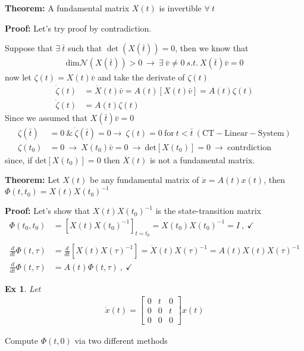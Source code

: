 \documentclass[twoside]{article}
\newtheorem{exmp}[theorem]{Ex}
\begin{document}
\textbf{Theorem:} A fundamental matrix $X(t)$ is invertible $\forall \ t$

\textbf{Proof:} Let's try proof by contradiction. 

Suppose that $\exists \ \bar{t}$ such that $\det( X(\bar{t}) ) = 0$, then we know that 
%
\begin{align*}
	\mathrm{dim} \mathcal{N}\left( X(\bar{t}) \right) > 0 \ \rightarrow \ \exists \ \bar{v}\neq0 \ s.t. \ X(\bar{t}) \bar{v} = 0
\end{align*}
%
now let $\zeta(t) = X(t) \bar{v}$ and take the derivate of $\zeta(t)$
%
\begin{align*}
	\dot{\zeta}(t) &= \dot{X}(t) \bar{v} = A(t) \left[ X(t) \bar{v} \right] = A(t) \zeta(t)
	\\
	\dot{\zeta}(t) &= A(t) \zeta(t)
\end{align*}
%
Since we assumed that $X(\bar{t}) \bar{v} = 0$
%
\begin{align*}
	\zeta(\bar{t}) &= 0 \ \& \ \dot{\zeta}(\bar{t}) = 0 \rightarrow \ \zeta(t) = 0 \ \mathrm{for} \ t < \bar{t} \ \mathrm{(CT-Linear-System)}
	\\
	\zeta(t_0) &= 0 \ \rightarrow \ X(t_0) \bar{v} = 0 \ \rightarrow \ \mathrm{det}[X(t_0)]=0 \ \rightarrow \ \mathrm{contrdiction}
\end{align*}
%
since, if $\mathrm{det}[X(t_0)]=0$ then $X(t)$ is not a fundamental matrix. 

\vspace{6pt}

\textbf{Theorem:} Let $X(t)$ be any fundamental matrix of $\dot{x} = A(t) x(t)$, then $\Phi(t,t_0) = X(t) X(t_0)^{-1}$

\textbf{Proof:} Let's show that $X(t) X(t_0)^{-1}$ is the state-transition matrix
%
\begin{align*}
\Phi(t_0,t_0) &= \left[ X(t) X(t_0)^{-1} \right]_{t=t_0} = X(t_0) X(t_0)^{-1}= I \ , \ \checkmark
	\\
	\\
	\frac{d}{dt} \Phi(t , \tau) &= \frac{d}{dt} \left[ X(t) X(\tau)^{-1} \right] = \dot{X}(t) X(\tau)^{-1}  = A(t) X(t) X(\tau)^{-1}
	\\
	\frac{d}{dt} \Phi(t , \tau) &= A(t) \Phi(t , \tau) \ , \ \checkmark
\end{align*}

\begin{exmp}
Let 
\begin{align*}
	\dot{x}(t) = \begin{bmatrix} 0 & t & 0 \\ 0 & 0 & t \\ 0 & 0 & 0 \end{bmatrix} x(t)
\end{align*}
\end{exmp}
%
Compute $\Phi(t,0)$ via two different methods
\end{document}
